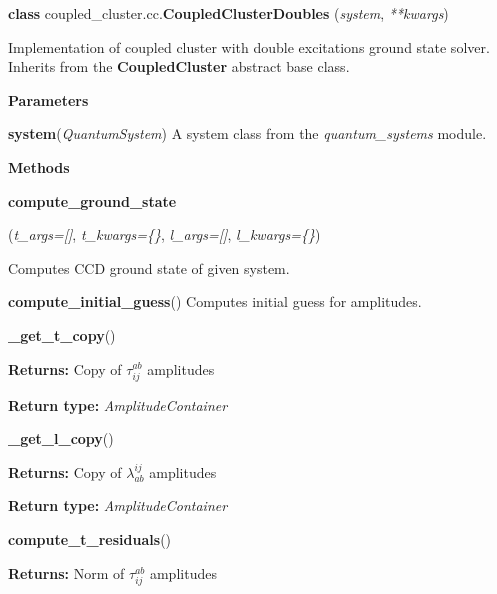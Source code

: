 \begin{tcolorbox}
    {\selectfont
    \textbf{class} coupled\_cluster.cc.\textbf{CoupledClusterDoubles}
    (\emph{system}, \emph{**kwargs})

    \vspace{1em}
    Implementation of coupled cluster with double excitations ground state solver. 
    Inherits from the \textbf{CoupledCluster} abstract base class.

    \vspace{1em}
    \textbf{Parameters}

    \hspace{2em}\textbf{system}(\emph{QuantumSystem}) A system class from the 
        \emph{quantum\_systems} module.

    \vspace{1em}
    \textbf{Methods} 
 
    \hspace{2em} \textbf{compute\_ground\_state}
        \begin{adjustwidth}{4em}{}
        (\emph{t\_args=[]}, \emph{t\_kwargs=\{\}}, \emph{l\_args=[]}, \emph{l\_kwargs=\{\}})
        
        Computes CCD ground state of given system.
        \end{adjustwidth}  

    \hspace{2em} \textbf{compute\_initial\_guess}()
        Computes initial guess for amplitudes.

    \hspace{2em} \textbf{\_get\_t\_copy}()
        \begin{adjustwidth}{4em}{}
        \textbf{Returns:} Copy of $\tau^{ab}_{ij}$ amplitudes
        
        \textbf{Return type:} \emph{AmplitudeContainer}
        \end{adjustwidth}

    \hspace{2em} \textbf{\_get\_l\_copy}()
        \begin{adjustwidth}{4em}{}
        \textbf{Returns:} Copy of $\lambda^{ij}_{ab}$ amplitudes
        
        \textbf{Return type:} \emph{AmplitudeContainer}
        \end{adjustwidth}

    \hspace{2em} \textbf{compute\_t\_residuals}()
        \begin{adjustwidth}{4em}{}
        \textbf{Returns:} Norm of $\tau^{ab}_{ij}$ amplitudes
        

\end{adjustwidth}}
\end{tcolorbox}
